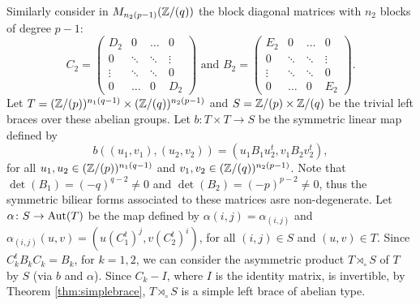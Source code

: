 Similarly consider in $M_{n_2(p-1)}(\mathbb{Z}/(q))$ the block diagonal matrices with $n_2$ blocks of degree $p-1$:
$$C_2=\left(\begin{array}{cccc}
	D_2&0&\ldots &0\\
	0&\ddots &\ddots&\vdots\\
	\vdots &\ddots &\ddots &0\\
	0&\ldots&0&D_2\end{array}\right)\mbox{ and } B_2=\left(\begin{array}{cccc}
	E_2&0&\ldots &0\\
	0&\ddots &\ddots&\vdots\\
	\vdots &\ddots &\ddots &0\\
	0&\ldots&0&E_2\end{array}\right).$$
Let $T=(\mathbb{Z}/(p))^{n_1(q-1)}\times (\mathbb{Z}/(q))^{n_2(p-1)}$ and $S=\mathbb{Z}/(p)\times\mathbb{Z}/(q)$ be the trivial left braces over these abelian groups.
Let $b\colon T\times T\rightarrow S$ be the symmetric linear map defined by
$$b((u_1,v_1),(u_2,v_2))=(u_1B_1u_2^t,v_1B_2v_2^t),$$
for all $u_1,u_2\in (\mathbb{Z}/(p))^{n_1(q-1)}$ and $v_1,v_2\in (\mathbb{Z}/(q))^{n_2(p-1)}$. Note that $\det(B_1)=(-q)^{q-2}\neq 0$ and $\det(B_2)=(-p)^{p-2}\neq 0$, thus the symmetric biliear forms associated to these matrices asre non-degenerate.
Let $\alpha\colon S\rightarrow \operatorname{Aut}(T)$ be the map defined by $\alpha(i,j)=\alpha_{(i,j)}$ and $\alpha_{(i,j)}(u,v)=(u(C_1^{t})^j,v(C_2^t)^{i})$, for all $(i,j)\in S$ and $(u,v)\in T$. Since $C_k^tB_kC_k=B_k$, for $k=1,2$, we can consider the asymmetric product $T\rtimes_{\circ}S$ of $T$ by $S$ (via $b$ and $\alpha$). Since $C_k-I$, where $I$ is the identity matrix, is invertible, by Theorem \ref{thm:simplebrace}, $T\rtimes_{\circ}S$ is a simple left brace of abelian type. 

